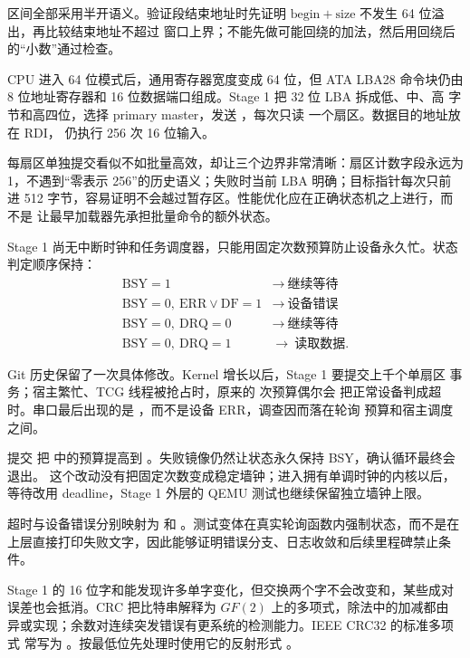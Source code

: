 区间全部采用半开语义。验证段结束地址时先证明
\(\mathrm{begin}+\mathrm{size}\) 不发生 64 位溢出，再比较结束地址不超过
窗口上界；不能先做可能回绕的加法，然后用回绕后的“小数”通过检查。

CPU 进入 64 位模式后，通用寄存器宽度变成 64 位，但 ATA LBA28 命令块仍由
8 位地址寄存器和 16 位数据端口组成。Stage 1 把 32 位 LBA 拆成低、中、高
字节和高四位，选择 primary master，发送 ，每次只读
一个扇区。数据目的地址放在 RDI， 仍执行 256 次 16 位输入。

每扇区单独提交看似不如批量高效，却让三个边界非常清晰：扇区计数字段永远为
1，不遇到“零表示 256”的历史语义；失败时当前 LBA 明确；目标指针每次只前进
512 字节，容易证明不会越过暂存区。性能优化应在正确状态机之上进行，而不是
让最早加载器先承担批量命令的额外状态。

Stage 1 尚无中断时钟和任务调度器，只能用固定次数预算防止设备永久忙。状态
判定顺序保持：
\[
\begin{array}{ll}
\mathrm{BSY}=1 & \rightarrow\ \text{继续等待}\\
\mathrm{BSY}=0,\ \mathrm{ERR}\lor\mathrm{DF}=1
  & \rightarrow\ \text{设备错误}\\
\mathrm{BSY}=0,\ \mathrm{DRQ}=0 & \rightarrow\ \text{继续等待}\\
\mathrm{BSY}=0,\ \mathrm{DRQ}=1 & \rightarrow\ \text{读取数据}.
\end{array}
\]

Git 历史保留了一次具体修改。Kernel 增长以后，Stage 1 要提交上千个单扇区
事务；宿主繁忙、TCG 线程被抢占时，原来的  次预算偶尔会
把正常设备判成超时。串口最后出现的是
，而不是设备 ERR，调查因而落在轮询
预算和宿主调度之间。

提交  把
 中的预算提高到
。失败镜像仍然让状态永久保持 BSY，确认循环最终会退出。
这个改动没有把固定次数变成稳定墙钟；进入拥有单调时钟的内核以后，等待改用
deadline，Stage 1 外层的 QEMU 测试也继续保留独立墙钟上限。

超时与设备错误分别映射为  和
。测试变体在真实轮询函数内强制状态，而不是在
上层直接打印失败文字，因此能够证明错误分支、日志收敛和后续里程碑禁止条件。

Stage 1 的 16 位字和能发现许多单字变化，但交换两个字不会改变和，某些成对
误差也会抵消。CRC 把比特串解释为 \(GF(2)\) 上的多项式，除法中的加减都由
异或实现；余数对连续突发错误有更系统的检测能力。IEEE CRC32 的标准多项式
常写为 。按最低位先处理时使用它的反射形式
。

